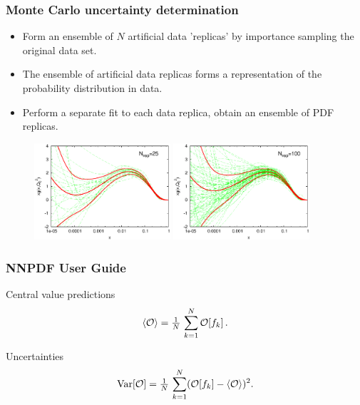 \documentclass[10pt]{beamer}
\newcommand{\be}{\begin{equation*}}
\newcommand{\ee}{\end{equation*}}
\newcommand{\vso}{\vskip15pt}
\def\smallfrac#1#2{\hbox{${{#1}\over {#2}}$}}
\begin{document}
\begin{frame}
\frametitle{Monte Carlo uncertainty determination}
\begin{itemize}
\item<1->Form an ensemble of $N$ artificial data 'replicas' by importance sampling the original data set.
\\
\item<1->The ensemble of artificial data replicas forms a representation of the probability distribution in data.
\\
\item<1->Perform a separate fit to each data replica, obtain an ensemble of PDF replicas.
\\
\end{itemize}
 \begin{figure}[b!]
    \begin{center}
      \includegraphics[width=0.45\textwidth]{glureplicas25.eps}
      \includegraphics[width=0.45\textwidth]{glureplicas100.eps}
    \end{center}
    \vskip-0.5cm
    \label{fig:pdf-jets}
\end{figure}


\end{frame}

\begin{frame}
\frametitle{NNPDF User Guide}

\begin{block}
{Central value predictions}
		\be \langle\mathcal{O}\rangle=\smallfrac{1}{N}\,\sum_{k=1}^{N}\mathcal{O}[f_k]\, .\ee
\end{block}
\vso
\begin{block}
{Uncertainties }
		\be {\mathrm{Var}}[\mathcal{O}]=\smallfrac{1}{N}\,\sum_{k=1}^{N}(\mathcal{O}[f_k] -  \langle\mathcal{O}\rangle )^2 .\ee
\end{block}
\vso
{}

\end{frame}
\end{document}

